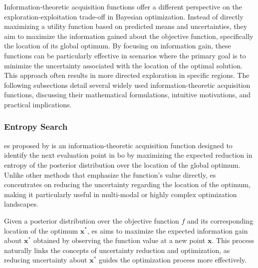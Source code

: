 Information-theoretic acquisition functions offer a different perspective on the exploration-exploitation trade-off in Bayesian optimization. Instead of directly maximizing a utility function based on predicted means and uncertainties, they aim to maximize the information gained about the objective function, specifically the location of its global optimum. By focusing on information gain, these functions can be particularly effective in scenarios where the primary goal is to minimize the uncertainty associated with the location of the optimal solution. This approach often results in more directed exploration in specific regions. The following subsections detail several widely used information-theoretic acquisition functions, discussing their mathematical formulations, intuitive motivations, and practical implications.

\subsubsection{Entropy Search}
\label{section:entropy_search}

\acf{es} proposed by \citet{hennig2012entropy} is an information-theoretic acquisition function designed to identify the next evaluation point in \ac{bo} by maximizing the expected reduction in entropy of the posterior distribution over the location of the global optimum. Unlike other methods that emphasize the function's value directly, \ac{es} concentrates on reducing the uncertainty regarding the location of the optimum, making it particularly useful in multi-modal or highly complex optimization landscapes.

Given a posterior distribution over the objective function $f$ and its corresponding location of the optimum $\mathbf{x}^*$, \ac{es} aims to maximize the expected information gain about $\mathbf{x}^*$ obtained by observing the function value at a new point $\mathbf{x}$. This process naturally links the concepts of uncertainty reduction and optimization, as reducing uncertainty about $\mathbf{x}^*$ guides the optimization process more effectively.

